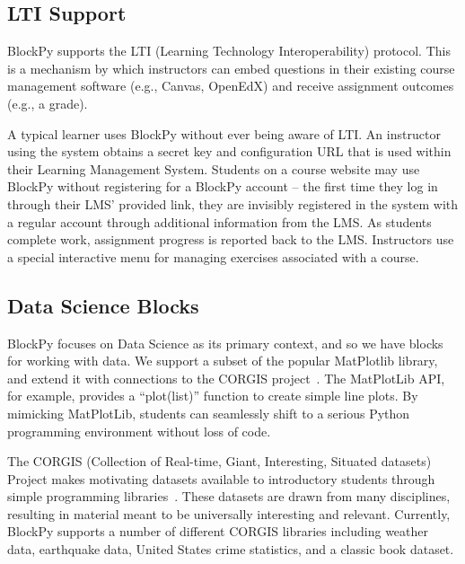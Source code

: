 \documentclass[10pt, conference, compsocconf]{IEEEtran}
\begin{document}
\subsection{LTI Support}


BlockPy supports the LTI (Learning Technology Interoperability) protocol.
This is a mechanism by which instructors can embed questions in their existing course management software (e.g., Canvas, OpenEdX) and receive assignment outcomes (e.g., a grade).

A typical learner uses BlockPy without ever being aware of LTI.
An instructor using the system obtains a secret key and configuration URL that is used within their Learning Management System.
Students on a course website may use BlockPy without registering for a BlockPy account -- the first time they log in through their LMS' provided link, they are invisibly registered in the system with a regular account through additional information from the LMS.
As students complete work, assignment progress is reported back to the LMS.
Instructors use a special interactive menu for managing exercises associated with a course.

\subsection{Data Science Blocks}

BlockPy focuses on Data Science as its primary context, and so we have blocks for working with data.
We support a subset of the popular MatPlotlib library, and extend it with connections to the CORGIS project~\cite{CORGIS}.
The MatPlotLib API, for example, provides a ``plot(list)'' function to create simple line plots.
By mimicking MatPlotLib, students can seamlessly shift to a serious Python programming environment without loss of code. 

The CORGIS (Collection of Real-time, Giant, Interesting, Situated datasets) Project makes motivating datasets available to introductory students through simple programming libraries~\cite{CORGIS}.
These datasets are drawn from many disciplines, resulting in material meant to be universally interesting and relevant.
Currently, BlockPy supports a number of different CORGIS libraries including weather data, earthquake data, United States crime statistics, and a classic book dataset.
\end{document}
